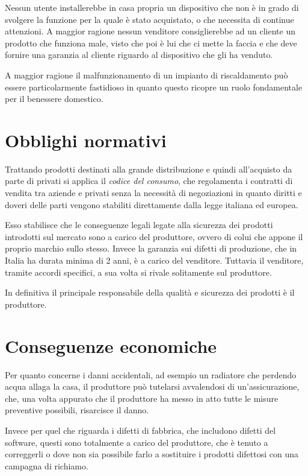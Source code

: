 \documentclass[12pt,a4paper,twoside,titlepage]{book}
\begin{document}
Nessun utente installerebbe in casa propria un dispositivo che non è in grado di svolgere la funzione 
per la quale è stato acquistato, o che necessita di continue attenzioni.
A maggior ragione nessun venditore consiglierebbe ad un cliente un prodotto che funziona male, 
visto che poi è lui che ci mette la faccia e che deve fornire una garanzia al cliente riguardo 
al dispositivo che gli ha venduto. 

A maggior ragione il malfunzionamento di un impianto di riscaldamento può essere particolarmente 
fastidioso in quanto questo ricopre un ruolo fondamentale per il benessere domestico.

\section{Obblighi normativi}

Trattando prodotti destinati alla grande distribuzione e quindi all'acquisto da parte 
di privati si applica il \textit{codice del consumo}, che regolamenta i contratti di vendita
tra aziende e privati senza la necessità di negoziazioni in quanto diritti e doveri delle parti 
vengono stabiliti direttamente dalla legge italiana ed europea.

Esso stabilisce che le conseguenze legali legate alla sicurezza dei prodotti introdotti sul mercato 
sono a carico del \gls{produttore}, ovvero di colui che appone il proprio marchio sullo stesso. 
Invece la garanzia sui difetti di produzione, che in Italia ha durata minima di 2 anni, è a carico 
del venditore. Tuttavia il venditore, tramite accordi specifici, a sua volta si rivale solitamente 
sul produttore. 

In definitiva il principale responsabile della qualità e sicurezza dei prodotti è il produttore.

\section{Conseguenze economiche}

Per quanto concerne i danni accidentali, ad esempio un radiatore che perdendo acqua allaga la casa,
il produttore può tutelarsi avvalendosi di un'assicurazione, che, una volta appurato che il produttore
ha messo in atto tutte le misure preventive possibili, risarcisce il danno. 

Invece per quel che riguarda i difetti di fabbrica, che includono difetti del software, questi sono 
totalmente a carico del produttore, che è tenuto a correggerli o dove non sia possibile farlo a sostituire 
i prodotti difettosi con una campagna di richiamo. 
\end{document}
